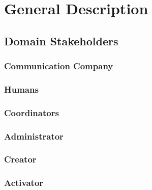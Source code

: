 
\chapter{General Description}
\label{chap:general_description}



\section{Domain Stakeholders}
\label{sec:lu.uni.lassy.excalibur.examples.icrash-gendescr-stakeholders}


\subsection{Communication Company}


\subsection{Humans}


\subsection{Coordinators}


\subsection{Administrator}


\subsection{Creator}


\subsection{Activator}



